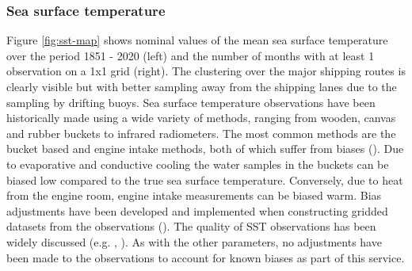 \subsubsection{Sea surface temperature}
Figure \ref{fig:sst-map} shows nominal values of the mean sea surface temperature over the period 1851 - 2020 (left) and the number of months with at least 1 observation on a 1x1 grid (right).
The clustering over the major shipping routes is clearly visible but with better sampling away from the shipping lanes due to the sampling by drifting buoys.
Sea surface temperature observations have been historically made using a wide variety of methods, ranging from wooden, canvas and rubber buckets to infrared radiometers. 
The most common methods are the bucket based and engine intake methods, both of which suffer from biases (\cite{Kent2017}). 
Due to evaporative and conductive cooling the water samples in the buckets can be biased low compared to the true sea surface temperature. 
Conversely, due to heat from the engine room, engine intake measurements can be biased warm. 
Bias adjustments have been developed and implemented when constructing gridded datasets from the observations (\cite{Kennedy2011_part2}). 
The quality of SST observations has been widely discussed (e.g. \cite{Kennedy2014}, \cite{Kent2017}).
As with the other parameters, no adjustments have been made to the observations to account for known biases as part of this service.

